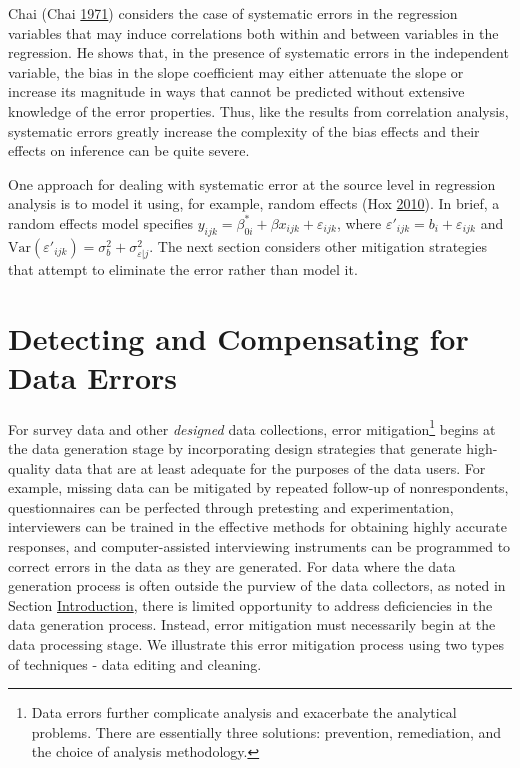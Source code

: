 \documentclass[]{krantz}
\begin{document}
Chai (Chai \protect\hyperlink{ref-chai1971correlated}{1971}) considers
the case of systematic errors in the regression variables that may
induce correlations both within and between variables in the regression.
He shows that, in the presence of systematic errors in the independent
variable, the bias in the slope coefficient may either attenuate the
slope or increase its magnitude in ways that cannot be predicted without
extensive knowledge of the error properties. Thus, like the results from
correlation analysis, systematic errors greatly increase the complexity
of the bias effects and their effects on inference can be quite severe.

One approach for dealing with systematic error at the source level in
regression analysis is to model it using, for example, random effects
(Hox \protect\hyperlink{ref-hox2010multilevel}{2010}). In brief, a
random effects model specifies
\(y_{ijk} = \beta_{0i}^\ast + \beta x_{ijk} + \varepsilon_{ijk}\), where
\({\varepsilon }'_{ijk} = b_i + \varepsilon_{ijk}\) and
\(\mathrm{Var}({\varepsilon }'_{ijk} ) = \sigma_b^2 + \sigma_{\varepsilon \vert j}^2\).
The next section considers other mitigation strategies that attempt to
eliminate the error rather than model it.

\section{Detecting and Compensating for Data Errors}\label{sec:10-5}

For survey data and other \emph{designed} data collections, error
mitigation\footnote{Data errors further complicate analysis and
  exacerbate the analytical problems. There are essentially three
  solutions: prevention, remediation, and the choice of analysis
  methodology.} begins at the data generation stage by incorporating
design strategies that generate high-quality data that are at least
adequate for the purposes of the data users. For example, missing data
can be mitigated by repeated follow-up of nonrespondents, questionnaires
can be perfected through pretesting and experimentation, interviewers
can be trained in the effective methods for obtaining highly accurate
responses, and computer-assisted interviewing instruments can be
programmed to correct errors in the data as they are generated. For data
where the data generation process is often outside the purview of the
data collectors, as noted in Section
\protect\hyperlink{sec:10-1}{Introduction}, there is limited opportunity
to address deficiencies in the data generation process. Instead, error
mitigation must necessarily begin at the data processing stage. We
illustrate this error mitigation process using two types of techniques -
data editing and cleaning.
\end{document}
